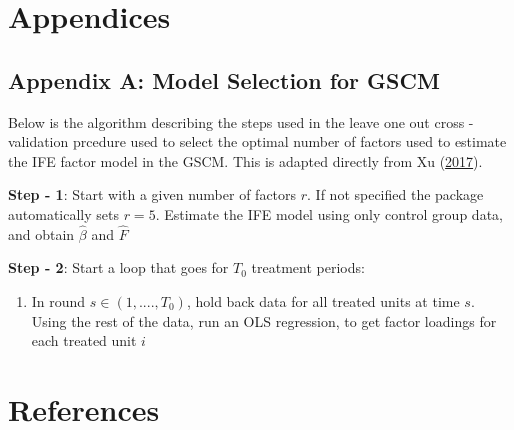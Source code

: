 \documentclass[12pt,nobind, a4paper]{reedthesis}
\providecommand{\tightlist}{%
	\setlength{\itemsep}{0pt}\setlength{\parskip}{0pt}}
\begin{document}
 \appendix

 \hypertarget{appendices}{%
 \chapter{Appendices}\label{appendices}}

 \hypertarget{appendix-a-model-selection-for-gscm}{%
 \section{Appendix A: Model Selection for GSCM}\label{appendix-a-model-selection-for-gscm}}

 Below is the algorithm describing the steps used in the leave one out cross - validation prcedure used to select the optimal number of factors used to estimate the IFE factor model in the GSCM. This is adapted directly from Xu (\protect\hyperlink{ref-xu_generalized_2017}{2017}).

 \textbf{Step - 1}: Start with a given number of factors \(r\). If not specified the package automatically sets \(r=5\). Estimate the IFE model using only control group data, and obtain \(\hat{\beta}\) and \(\hat{F}\)

 \textbf{Step - 2}: Start a loop that goes for \(T_{0}\) treatment periods:
 \begin{enumerate}
 \def\labelenumi{(\alph{enumi})}
 \tightlist
 \item
   In round \(s \in (1,....,T_{0})\), hold back data for all treated units at time \(s\). Using the rest of the data, run an OLS regression, to get factor loadings for each treated unit \(i\)
 \end{enumerate}
 \backmatter

 \hypertarget{references}{%
 \chapter*{References}\label{references}}


 \noindent

 \setlength{\parindent}{-0.20in}
\end{document}
